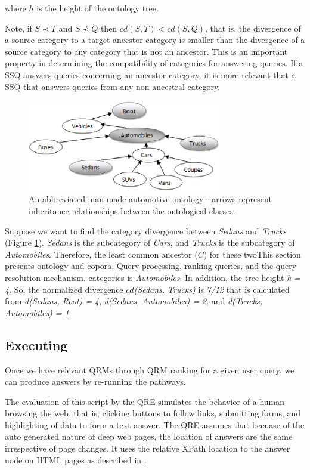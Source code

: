 \noindent where $h$ is the height of the ontology tree.

Note, if $S \prec T$ and $S \not\prec Q$ then $cd(S,T) <
cd(S,Q)$, that is, the divergence of a source category to a target
ancestor category is smaller than the divergence of a source category to any
category that is not an ancestor. This is an important property in
determining the compatibility of categories for answering queries.  If a
SSQ answers queries concerning an ancestor category, it is more relevant
that a SSQ that answers queries from any non-ancestral category.

\begin{figure}[t]
\centering
\includegraphics[width=85mm]{img/automotive_ontology.eps}
\caption{An abbreviated man-made automotive ontology - arrows represent inheritance relationships between the ontological classes.}
\label{fig:automotive_ontology}
\end{figure}

Suppose we want to find the category divergence between \textit{Sedans}
and \textit{Trucks} (Figure \ref{fig:automotive_ontology}). 
\textit{Sedans} is the subcategory of \textit{Cars}, and \textit{Trucks}
is the subcategory of \textit{Automobiles}. Therefore, the least common ancestor ($C$)
for these twoThis section presents ontology and copora, Query processing, ranking queries, and the query resolution mechanism. categories is \textit{Automobiles}. In addition, the tree height \textit{h = 4}.
So, the normalized divergence $cd$\textit{(Sedans, Trucks)} is \textit{7/12}
that is calculated from \textit{d(Sedans, Root) = 4}, \textit{d(Sedans, Automobiles) = 2}, and \textit{d(Trucks, Automobiles) = 1}.


\subsection{Executing} 

Once we have relevant QRMs through QRM ranking for a given user query, we can produce answers by re-running the pathways.

 The evaluation of this script by the QRE simulates the behavior of a human browsing the web, that is, clicking buttons to follow links, submitting forms, and highlighting of data to form a text answer.  The QRE assumes that becuase of the auto generated nature of deep web pages, the location of answers are the same irrespective of page changes.  It uses the relative XPath location to the answer node on HTML pages as described in \cite{Badica06}.


